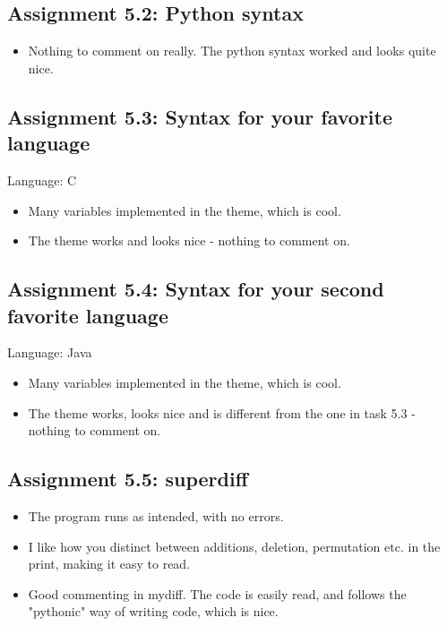 \documentclass[a4paper]{article}
\begin{document}
\subsection*{Assignment 5.2: Python syntax} \label{sec:assignment5.2}
\begin{itemize}
\item Nothing to comment on really. The python syntax worked and looks quite nice. 
\end{itemize}

\subsection*{Assignment 5.3: Syntax for your favorite language}
Language: C
\begin{itemize}
\item Many variables implemented in the theme, which is cool.
\item The theme works and looks nice - nothing to comment on. 
\end{itemize}


\subsection*{Assignment 5.4: Syntax for your second favorite language}
Language: Java
\begin{itemize}
\item Many variables implemented in the theme, which is cool.
\item The theme works, looks nice and is different from the one in task 5.3 - nothing to comment on.  
\end{itemize}

\subsection*{Assignment 5.5: superdiff}
\begin{itemize}
\item The program runs as intended, with no errors. 
\item I like how you distinct between additions, deletion, permutation etc. in the print, making it easy to read.
\item Good commenting in mydiff. The code is easily read, and follows the "pythonic" way of writing code, which is nice. 
\end{itemize}
\end{document}
